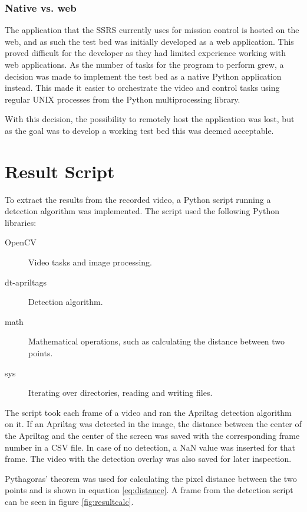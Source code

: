 \documentclass[nofilelist]{cslthse-msc}
\begin{document}
\subsubsection{Native vs. web}
The application that the SSRS currently uses for mission control is hosted on the web, and as such the test bed was initially developed as a web application. This proved difficult for the developer as they had limited experience working with web applications. As the number of tasks for the program to perform grew, a decision was made to implement the test bed as a native Python application instead. This made it easier to orchestrate the video and control tasks using regular UNIX processes from the Python multiprocessing library. 

With this decision, the possibility to remotely host the application was lost, but as the goal was to develop a working test bed this was deemed acceptable. 

\section{Result Script}
\label{sec:resultscript}
To extract the results from the recorded video, a Python script running a detection algorithm was implemented. The script used the following Python libraries:
\begin{description}
   \item[OpenCV] Video tasks and image processing.
   \item[dt-apriltags] Detection algorithm.
   \item[math] Mathematical operations, such as calculating the distance between two points.
   \item[sys] Iterating over directories, reading and writing files.  
\end{description}

The script took each frame of a video and ran the Apriltag detection algorithm on it. If an Apriltag was detected in the image, the distance between the center of the Apriltag and the center of the screen was saved with the corresponding frame number in a CSV file. In case of no detection, a NaN value was inserted for that frame. The video with the detection overlay was also saved for later inspection.

Pythagoras' theorem was used for calculating the pixel distance between the two points and is shown in equation \ref{eq:distance}. A frame from the detection script can be seen in figure \ref{fig:resultcalc}.
\end{document}
